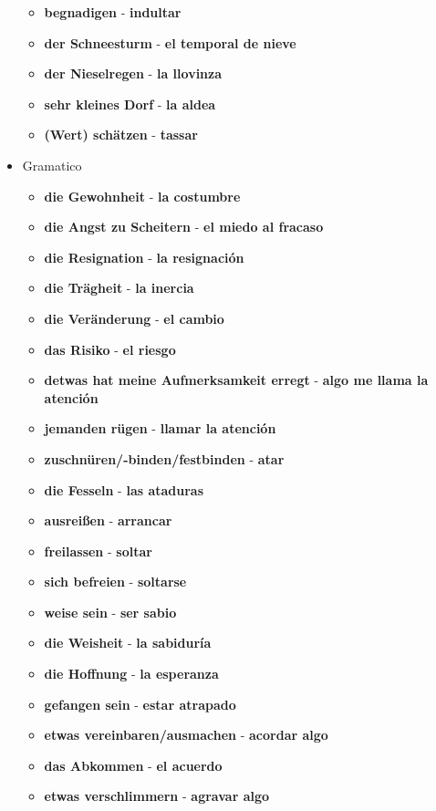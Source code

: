\documentclass{article}
\begin{document}
\begin{multicols}{2}
\begin{itemize}
\begin{itemize}
			\item{\textbf{begnadigen} - \textbf{indultar}}
			\item{\textbf{der Schneesturm} - \textbf{el temporal de nieve}}
			\item{\textbf{der Nieselregen} - \textbf{la llovinza}}
			\item{\textbf{sehr kleines Dorf} - \textbf{la aldea}}
			\item{\textbf{(Wert) schätzen} - \textbf{tassar}}
		\end{itemize}
		\item{Gramatico}
		\begin{itemize}
			\item{\textbf{die Gewohnheit} - \textbf{la costumbre}}
			\item{\textbf{die Angst zu Scheitern} - \textbf{el miedo al fracaso}}
			\item{\textbf{die Resignation} - \textbf{la resignación}}
			\item{\textbf{die Trägheit} - \textbf{la inercia}}
			\item{\textbf{die Veränderung} - \textbf{el cambio}}
			\item{\textbf{das Risiko} - \textbf{el riesgo}}
			\item{\textbf{detwas hat meine Aufmerksamkeit erregt} - \textbf{algo me llama la atención}}
			\item{\textbf{jemanden rügen} - \textbf{llamar la atención}}
			\item{\textbf{zuschnüren/-binden/festbinden} - \textbf{atar}}
			\item{\textbf{die Fesseln} - \textbf{las ataduras}}
			\item{\textbf{ausreißen} - \textbf{arrancar}}
			\item{\textbf{freilassen} - \textbf{soltar}}
			\item{\textbf{sich befreien} - \textbf{soltarse}}
			\item{\textbf{weise sein} - \textbf{ser sabio}}
			\item{\textbf{die Weisheit} - \textbf{la sabiduría}}
			\item{\textbf{die Hoffnung} - \textbf{la esperanza}}
			\item{\textbf{gefangen sein} - \textbf{estar atrapado}}
			\item{\textbf{etwas vereinbaren/ausmachen} - \textbf{acordar algo}}
			\item{\textbf{das Abkommen} - \textbf{el acuerdo}}
			\item{\textbf{etwas verschlimmern} - \textbf{agravar algo}}

\end{itemize}
\end{itemize}
\end{multicols}
\end{document}
